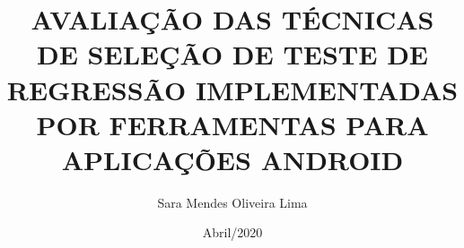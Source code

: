 \documentclass[pt, qual, classic, oneside, a4paper, scr]{ufba/ufbathesis}
\institute{Instituto de Matem\'{a}tica e Estatística}
\title{AVALIAÇÃO DAS TÉCNICAS DE SELEÇÃO DE TESTE DE REGRESSÃO IMPLEMENTADAS POR FERRAMENTAS PARA APLICAÇÕES ANDROID}
\date{Abril/2020}
\author{Sara Mendes Oliveira Lima}
\begin{document}
\pgcompfrontpage
\frontmatter

\pgcomppresentationpage



\tableofcontents
\listoffigures
\listoftables



\mainmatter






\backmatter





\end{document}
